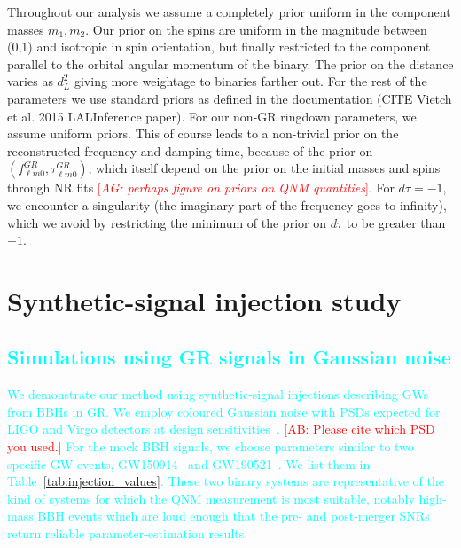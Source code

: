\documentclass[twocolumn,prd,aps,superscriptaddress,preprintnumbers,tightenlines,showpacs,nofootinbib,eqsecnum,amsfonts,amsmath]{revtex4-1}
\newcommand{\abhi}[1]{\textcolor{red}{[\textit{AG: #1}]}}
\newcommand{\ab}[1]{\textcolor{cyan}{#1}}
\newcommand{\comment}[1]{\textcolor{red}{[#1]}}
\begin{document}
Throughout our analysis we assume a completely prior uniform in the component masses $m_1, m_2$. Our prior on the spins are uniform in the magnitude between (0,1) and isotropic in spin orientation, but finally restricted to the component parallel to the orbital angular momentum of the binary. The prior on the distance varies as $d_L^2$ giving more weightage to binaries farther out. For the rest of the parameters we use standard priors as defined in the documentation (CITE Vietch et al. 2015 LALInference paper). For our non-GR ringdown parameters, we assume uniform priors. This of course leads to a non-trivial prior on the reconstructed frequency and damping time, because of the prior on $( f_{\ell m 0}^{GR},\tau_{\ell m 0}^{GR})$, which itself depend on the prior on the initial masses and spins through NR fits \abhi{perhaps figure on priors on QNM quantities}. For $d\tau = -1$, we encounter a singularity (the imaginary part of the frequency goes to infinity), which we avoid by restricting the minimum of the prior on $d\tau$ to be greater than $-1$.
\fi

\section{Synthetic-signal injection study}\label{sec:results}

\subsection{\ab{Simulations using GR signals in Gaussian noise}} \label{ssec:gr_signal}

\ab{We demonstrate our method using synthetic-signal injections describing GWs 
from BBHs in GR. We employ coloured Gaussian noise with PSDs expected for LIGO and 
Virgo detectors at design sensitivities~\cite{}. \comment{AB: Please cite which PSD you used.} 
For the mock BBH signals, we choose parameters similar to two specific GW events, GW150914~\cite{} and 
GW190521~\cite{}. We list them in Table~\ref{tab:injection_values}. 
These two binary systems are representative of the kind of systems for which 
the QNM measurement is most suitable, notably high-mass BBH events which are loud enough that the  
pre- and post-merger SNRs return reliable parameter-estimation results.}
\end{document}
